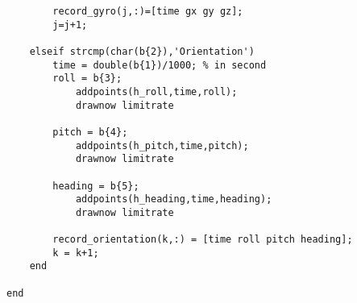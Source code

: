 \begin{lstlisting}
        record_gyro(j,:)=[time gx gy gz];
        j=j+1;
        
    elseif strcmp(char(b{2}),'Orientation')
        time = double(b{1})/1000; % in second
        roll = b{3};
            addpoints(h_roll,time,roll);
            drawnow limitrate
            
        pitch = b{4};
            addpoints(h_pitch,time,pitch);
            drawnow limitrate
            
        heading = b{5};
            addpoints(h_heading,time,heading);
            drawnow limitrate
            
        record_orientation(k,:) = [time roll pitch heading];
        k = k+1;
    end 

end 
\end{lstlisting}
